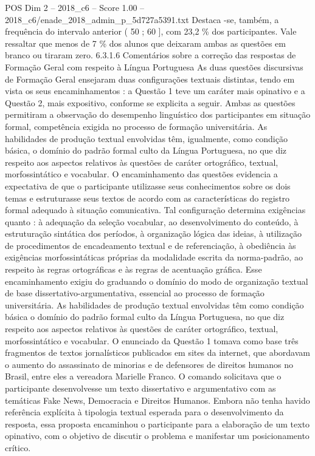 \begin{textsample}{POS Dim 2 – 2018\_c6 – Score 1.00 – 2018\_c6/enade\_2018\_admin\_p\_5d727a5391.txt}
Destaca -se, também, a frequência do intervalo anterior ( 50 ; 60 ], com 23,2 \% dos participantes.
Vale ressaltar que menos de 7 \% dos alunos que deixaram ambas as questões em branco ou tiraram zero. 6.3.1.6 Comentários sobre a correção das respostas de Formação Geral com respeito à Língua Portuguesa As duas questões discursivas de Formação Geral ensejaram duas configurações textuais distintas, tendo em vista os seus encaminhamentos : a Questão 1 teve um caráter mais opinativo e a Questão 2, mais expositivo, conforme se explicita a seguir.
Ambas as questões permitiram a observação do desempenho linguístico dos participantes em situação formal, competência exigida no processo de formação universitária.
As habilidades de produção textual envolvidas têm, igualmente, como condição básica, o domínio do padrão formal culto da Língua Portuguesa, no que diz respeito aos aspectos relativos às questões de caráter ortográfico, textual, morfossintático e vocabular.
O encaminhamento das questões evidencia a expectativa de que o participante utilizasse seus conhecimentos sobre os dois temas e estruturasse seus textos de acordo com as características do registro formal adequado à situação comunicativa.
Tal configuração determina exigências quanto : à adequação da seleção vocabular, ao desenvolvimento do conteúdo, à estruturação sintática dos períodos, à organização lógica das ideias, à utilização de procedimentos de encadeamento textual e de referenciação, à obediência às exigências morfossintáticas próprias da modalidade escrita da norma-padrão, ao respeito às regras ortográficas e às regras de acentuação gráfica.
Esse encaminhamento exigiu do graduando o domínio do modo de organização textual de base dissertativo-argumentativa, essencial ao processo de formação universitária.
As habilidades de produção textual envolvidas têm como condição básica o domínio do padrão formal culto da Língua Portuguesa, no que diz respeito aos aspectos relativos às questões de caráter ortográfico, textual, morfossintático e vocabular.
O enunciado da Questão 1 tomava como base três fragmentos de textos jornalísticos publicados em sites da internet, que abordavam o aumento do assassinato de minorias e de defensores de direitos humanos no Brasil, entre eles a vereadora Marielle Franco.
O comando solicitava que o participante desenvolvesse um texto dissertativo e argumentativo com as temáticas Fake News, Democracia e Direitos Humanos.
Embora não tenha havido referência explícita à tipologia textual esperada para o desenvolvimento da resposta, essa proposta encaminhou o participante para a elaboração de um texto opinativo, com o objetivo de discutir o problema e manifestar um posicionamento crítico.

\end{textsample}
